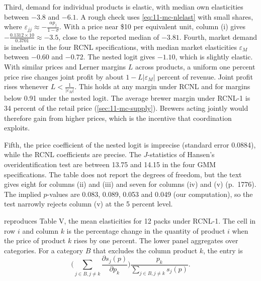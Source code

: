 Third, demand for individual products is elastic, with median own elasticities between $-3.8$ and $-6.1$. A rough
check uses \eqref{eq:11-mc-nlelast} with small shares, where $\varepsilon_{jj} \approx -\frac{\alpha p_j}{1-\sigma}$.
With a price near \$10 per equivalent unit, column (i) gives $-\frac{0.1312 \times 10}{0.3701} \approx -3.5$, close
to the reported median of $-3.81$. Fourth, market demand is inelastic in the four RCNL specifications, with median
market elasticities $\varepsilon_M$ between $-0.60$ and $-0.72$. The nested logit gives $-1.10$, which is slightly
elastic. With similar prices and Lerner margins $L$ across products, a uniform one percent price rise changes joint
profit by about $1 - L|\varepsilon_M|$ percent of revenue. Joint profit rises whenever $L < \frac{1}{|\varepsilon_M|}$.
This holds at any margin under RCNL and for margins below 0.91 under the nested logit. The average brewer margin
under RCNL-1 is 34 percent of the retail price (\cref{sec:11-mc-supply}). Brewers acting jointly would therefore
gain from higher prices, which is the incentive that coordination exploits.

Fifth, the price coefficient of the nested logit is imprecise (standard error 0.0884), while the RCNL coefficients
are precise. The $J$-statistics of Hansen's overidentification test \citep{Hansen1982} are between 13.75 and 14.15 in the four GMM
specifications. The table does not report the degrees of freedom, but the text gives eight for columns (ii) and (iii)
and seven for columns (iv) and (v) (p.~1776). The implied $p$-values are 0.083, 0.089, 0.053 and 0.049 (our
computation), so the test narrowly rejects column (v) at the 5 percent level.

 reproduces Table V, the mean elasticities for 12 packs under RCNL-1. The cell in row $i$ and
column $k$ is the percentage change in the quantity of product $i$ when the price of product $k$ rises by one
percent. The lower panel aggregates over categories. For a category $B$ that excludes the column product $k$, the
entry is
\begin{equation}\label{eq:11-mc-catelast}
  \Big(\sum_{j\in B, j\neq k}\frac{\partial s_j(p)}{\partial p_k}\Big)\frac{p_k}{\sum_{j\in B,j\neq k}s_j(p)} .
\end{equation}

